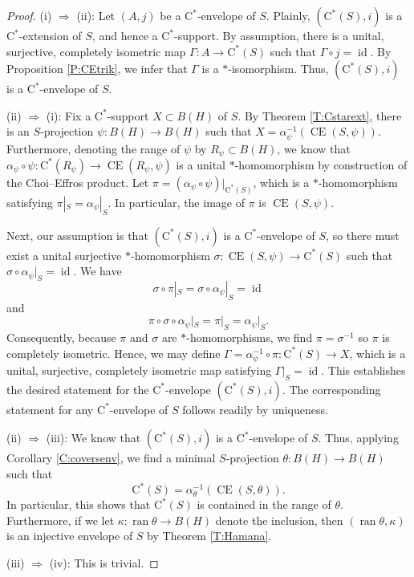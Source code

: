 \documentclass[10pt]{amsart}
\newcommand{\rC}{\mathrm{C}}
\newcommand{\CE}{\operatorname{CE}}
\newcommand{\id}{\operatorname{id}}
\newcommand{\ran}{\operatorname{ran}}
\theoremstyle{definition}
\begin{document}
\begin{proof}
(i) $\Rightarrow$ (ii): Let $(A,j)$ be a $\rC^*$-envelope of $S$. Plainly,  $(\rC^*(S),i)$ is a $\rC^*$-extension of $S$, and hence a $\rC^*$-support. By assumption, there is a unital, surjective, completely isometric map $\Gamma:A\to \rC^*(S)$ such that $\Gamma\circ j=\id$. By Proposition \ref{P:CEtrik}, we infer that $\Gamma$ is a $*$-isomorphism. Thus, $(\rC^*(S),i)$ is a  $\rC^*$-envelope of $S$.


(ii) $\Rightarrow$ (i):  Fix a $\rC^*$-support $X\subset B(H)$ of $S$. By Theorem \ref{T:Cstarext}, there is an $S$-projection $\psi:B(H)\to B(H)$ such that $X=\alpha_\psi^{-1}(\CE(S,\psi))$. Furthermore, denoting the range of $\psi$ by $R_\psi\subset B(H)$, we know that $\alpha_\psi\circ \psi:\rC^*(R_\psi)\to \CE(R_\psi,\psi)$ is a unital  $*$-homomorphism by construction of the Choi--Effros product. Let $\pi=(\alpha_\psi\circ \psi)|_{\rC^*(S)}$, which is a $*$-homomorphism satisfying $\pi|_S=\alpha_\psi|_S$. In particular, the image of $\pi$ is $\CE(S,\psi)$. 

Next, our assumption is that $(\rC^*(S),i)$ is a $\rC^*$-envelope of $S$, so there must exist a unital surjective $*$-homomorphism $\sigma:\CE(S,\psi)\to \rC^*(S)$ such that $\sigma \circ \alpha_\psi|_S=\id$. We have
\[
\sigma\circ \pi|_S=\sigma\circ \alpha_\psi|_S=\id 
\]
and
\[
\pi\circ \sigma\circ \alpha_\psi|_S=\pi|_S=\alpha_\psi|_S.
\]
Consequently, because $\pi$ and $\sigma$ are $*$-homomorphisms, we find $\pi=\sigma^{-1}$ so $\pi$ is completely isometric.
Hence, we may define $\Gamma=\alpha_\psi^{-1}\circ \pi:\rC^*(S)\to X$, which is a unital, surjective, completely isometric map satisfying $\Gamma|_S=\id$.  This establishes the desired statement for the $\rC^*$-envelope $(\rC^*(S),i)$. The corresponding statement for any $\rC^*$-envelope of $S$ follows readily by uniqueness.

(ii) $\Rightarrow$ (iii): We know that $(\rC^*(S),i)$ is a $\rC^*$-envelope of $S$. Thus, applying Corollary \ref{C:coversenv}, we find a minimal $S$-projection $\theta:B(H)\to B(H)$ such that  \[\rC^*(S)=\alpha_\theta ^{-1}(\CE(S,\theta)).\] In particular, this shows that $\rC^*(S)$ is contained in the range of $\theta$. Furthermore, if we let $\kappa:\ran\theta\to B(H)$ denote the inclusion, then $(\ran \theta, \kappa)$  is an injective envelope of $S$ by Theorem \ref{T:Hamana}.

(iii) $\Rightarrow$ (iv): This is trivial. 


\end{proof}
\end{document}
